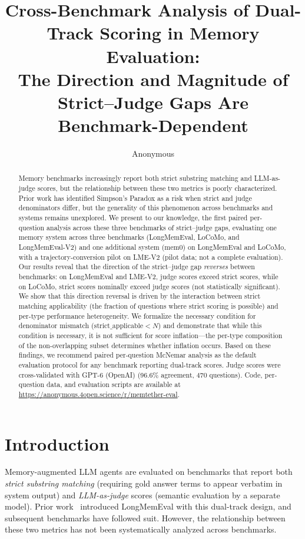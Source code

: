 \documentclass[10pt]{article}
\title{Cross-Benchmark Analysis of Dual-Track Scoring in Memory Evaluation:\\The Direction and Magnitude of Strict--Judge Gaps Are Benchmark-Dependent}
\author{Anonymous}
\date{}
\begin{document}
\maketitle

\begin{abstract}
Memory benchmarks increasingly report both strict substring matching and LLM-as-judge scores, but the relationship between these two metrics is poorly characterized. Prior work has identified Simpson's Paradox as a risk when strict and judge denominators differ, but the generality of this phenomenon across benchmarks and systems remains unexplored. We present to our knowledge, the first paired per-question analysis across these three benchmarks of strict--judge gaps, evaluating one memory system across three benchmarks (LongMemEval, LoCoMo, and LongMemEval-V2) and one additional system (mem0) on LongMemEval and LoCoMo, with a trajectory-conversion pilot on LME-V2 (pilot data; not a complete evaluation). Our results reveal that the direction of the strict--judge gap \emph{reverses} between benchmarks: on LongMemEval and LME-V2, judge scores exceed strict scores, while on LoCoMo, strict scores nominally exceed judge scores (not statistically significant). We show that this direction reversal is driven by the interaction between strict matching applicability (the fraction of questions where strict scoring is possible) and per-type performance heterogeneity. We formalize the necessary condition for denominator mismatch ($\text{strict\_applicable} < N$) and demonstrate that while this condition is necessary, it is not sufficient for score inflation---the per-type composition of the non-overlapping subset determines whether inflation occurs. Based on these findings, we recommend paired per-question McNemar analysis as the default evaluation protocol for any benchmark reporting dual-track scores. Judge scores were cross-validated with GPT-6 (OpenAI) (96.6\% agreement, 470 questions). Code, per-question data, and evaluation scripts are available at \url{https://anonymous.4open.science/r/memtether-eval}.
\end{abstract}

\section{Introduction}
Memory-augmented LLM agents are evaluated on benchmarks that report both \emph{strict substring matching} (requiring gold answer terms to appear verbatim in system output) and \emph{LLM-as-judge} scores (semantic evaluation by a separate model). Prior work~\citep{wu2024longmemeval} introduced LongMemEval with this dual-track design, and subsequent benchmarks have followed suit. However, the relationship between these two metrics has not been systematically analyzed across benchmarks.
\end{document}
